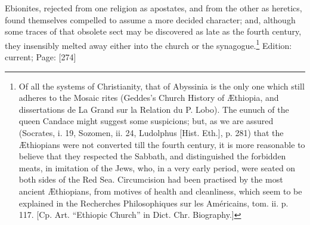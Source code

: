 Ebionites, rejected from one religion as apostates, and from the other as heretics, found themselves compelled to assume a more decided character; and, although some traces of that obsolete sect may be discovered as late as the fourth century, they insensibly melted away either into the church or the synagogue.\footnote{Of all the systems of Christianity, that of Abyssinia is the only one which still adheres to the Mosaic rites (Geddes\texthebrew{}’s Church History of Æthiopia, and dissertations de La Grand sur la Relation du P. Lobo). The eunuch of the queen Candace might suggest some suspicions; but, as we are assured (Socrates, i. 19, Sozomen, ii. 24, Ludolphus [Hist. Eth.], p. 281) that the Æthiopians were not converted till the fourth century, it is more reasonable to believe that they respected the Sabbath, and distinguished the forbidden meats, in imitation of the Jews, who, in a very early period, were seated on both sides of the Red Sea. Circumcision had been practised by the most ancient Æthiopians, from motives of health and cleanliness, which seem to be explained in the Recherches Philosophiques sur les Américains, tom. ii. p. 117. [Cp. Art. \texthebrew{“}Ethiopic Church\texthebrew{}” in Dict. Chr. Biography.]}
Edition: current; Page: [274]

